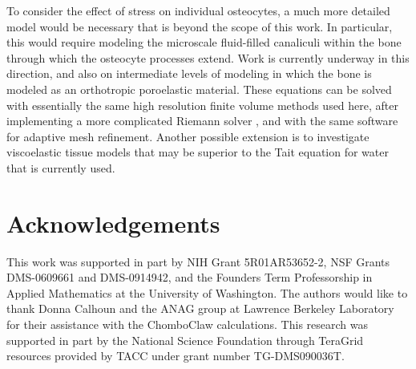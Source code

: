\documentclass{article}
\begin{document}
To consider the effect of stress on individual osteocytes,
a much more detailed model would be necessary that is beyond the scope
of this work.  In particular, 
this would require modeling the microscale fluid-filled canaliculi
within the bone through which the osteocyte processes extend. Work is
currently underway in this direction, and also on intermediate levels of
modeling in which the bone is modeled as an orthotropic poroelastic
material.  These equations can be solved with essentially the same high
resolution finite volume methods used here, after implementing a more
complicated Riemann solver \cite{lemoine:pc}, and with the same software for
adaptive mesh refinement.
Another possible extension is to
investigate viscoelastic tissue models that may be superior to the
Tait equation for water that is currently used.  


\section*{Acknowledgements}
This work was supported in part by NIH Grant 5R01AR53652-2,
NSF Grants DMS-0609661 and DMS-0914942, and the Founders Term Professorship
in Applied Mathematics at the University of Washington.
The authors would like to thank Donna Calhoun and the ANAG 
group at Lawrence Berkeley Laboratory for their assistance with the ChomboClaw calculations.
This research was supported in part by the National Science Foundation through 
TeraGrid resources provided by TACC under grant number TG-DMS090036T.



\end{document}

